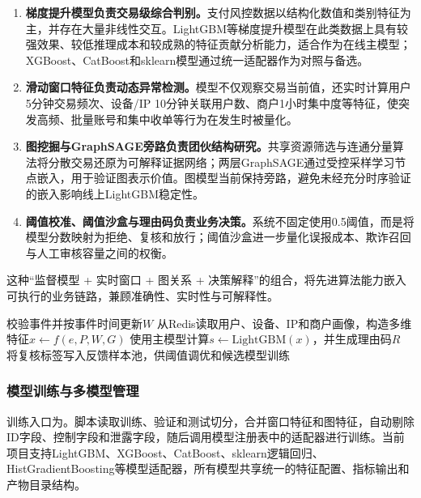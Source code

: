 \begin{enumerate}
  \item \textbf{梯度提升模型负责交易级综合判别。}支付风控数据以结构化数值和类别特征为主，并存在大量非线性交互。LightGBM等梯度提升模型在此类数据上具有较强效果、较低推理成本和较成熟的特征贡献分析能力，适合作为在线主模型；XGBoost、CatBoost和sklearn模型通过统一适配器作为对照与备选。
  \item \textbf{滑动窗口特征负责动态异常检测。}模型不仅观察交易当前值，还实时计算用户5分钟交易频次、设备/IP 10分钟关联用户数、商户1小时集中度等特征，使突发高频、批量账号和集中收单等行为在发生时被量化。
  \item \textbf{图挖掘与GraphSAGE旁路负责团伙结构研究。}共享资源筛选与连通分量算法将分散交易还原为可解释证据网络；两层GraphSAGE通过受控采样学习节点嵌入，用于验证图表示价值。图模型当前保持旁路，避免未经充分时序验证的嵌入影响线上LightGBM稳定性。
  \item \textbf{阈值校准、阈值沙盒与理由码负责业务决策。}系统不固定使用0.5阈值，而是将模型分数映射为拒绝、复核和放行；阈值沙盒进一步量化误报成本、欺诈召回与人工审核容量之间的权衡。
\end{enumerate}

这种“监督模型 + 实时窗口 + 图关系 + 决策解释”的组合，将先进算法能力嵌入可执行的业务链路，兼顾准确性、实时性与可解释性。

\begin{algorithm}[H]
\caption{实时诈骗判定与分级处置}
\label{alg:realtime_fraud_decision}
校验事件并按事件时间更新$W$\;
从Redis读取用户、设备、IP和商户画像，构造多维特征$x \leftarrow f(e,P,W,G)$\;
使用主模型计算$s \leftarrow \mathrm{LightGBM}(x)$，并生成理由码$R$\;
将复核标签写入反馈样本池，供阈值调优和候选模型训练\;
\end{algorithm}

\subsubsection{模型训练与多模型管理}

训练入口为。脚本读取训练、验证和测试切分，合并窗口特征和图特征，自动剔除ID字段、控制字段和泄露字段，随后调用模型注册表中的适配器进行训练。当前项目支持LightGBM、XGBoost、CatBoost、sklearn逻辑回归、HistGradientBoosting等模型适配器，所有模型共享统一的特征配置、指标输出和产物目录结构。

